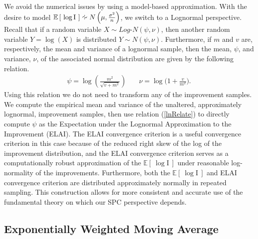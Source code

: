 \documentclass[12pt]{article}
\newcommand{\E}[1]{
        \mathbb{E}\left[~#1~\right]
}
\newcommand*{\approxdist}{\mathrel{\vcenter{\offinterlineskip
\vskip-.25ex\hbox{\hskip.55ex$\cdot$}\vskip-.25ex\hbox{$\sim$}
\vskip-.5ex\hbox{\hskip.55ex$\cdot$}}}}
\begin{document}
%
We avoid the numerical issues by using a model-based approximation. With the desire to model $\mathbb{E}\left[~\log\text{I}~\right] \approxdist N\left(\mu, \frac{\sigma^2}{n}\right)$, we switch to a Lognormal perspective.   
%
Recall that if a random variable \mbox{$X\sim Log$-$N(\psi, \nu)$,} then another random variable $Y=\log(X)$ is distributed $Y\sim N(\psi, \nu)$.
Furthermore, if $m$ and $v$ are, respectively, the mean and variance of a lognormal sample, then the mean, $\psi$, and variance, $\nu$, of the associated normal distribution are given by the following relation.
%
\begin{eqnarray}
\psi = \log\left( \frac{m^2}{\sqrt{v+m^2}} \right) &~&  \nu = \log\bigg( 1+ \frac{v}{m^2} \bigg).
\label{lnRelate}
\end{eqnarray}
%
Using this relation we do not need to transform any of the improvement samples.
%
We compute the empirical mean and variance of the unaltered, approximately lognormal, improvement samples, then use relation (\ref{lnRelate}) to directly compute $\psi$ as the Expectation under the Lognormal Approximation to the Improvement (ELAI).
The ELAI convergence criterion is a useful convergence criterion in this case because of the reduced right skew of the log of the improvement distribution, and the ELAI convergence criterion serves as a computationally robust approximation of the $\E{\log\text{I}}$ under reasonable log-normality of the improvements.
Furthermore, both the $\E{\log\text{I}}$ and ELAI convergence criterion are distributed approximately normally in repeated sampling.
%
This construction allows for more consistent and accurate use of the fundamental theory on which our SPC perspective depends.


%
%
\subsection{Exponentially Weighted Moving Average}
%
%
\end{document}
